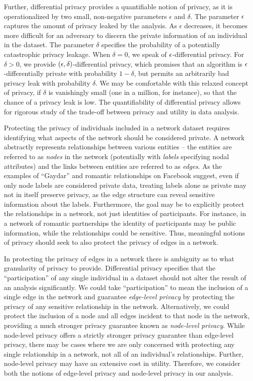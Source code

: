 Further, differential privacy provides a quantifiable notion of privacy, as it is operationalized by two small, non-negative parameters $\epsilon$ and $\delta$. The parameter $\epsilon$ captures the amount of privacy leaked by the analysis. As $\epsilon$ decreases, it becomes more difficult for an adversary to discern the private information of an individual in the dataset. The parameter $\delta$ specifies the probability of a potentially catastrophic privacy leakage. When $\delta = 0$, we speak of $\epsilon$-differential privacy. For $\delta > 0$, we provide $(\epsilon, \delta)$-differential privacy, which promises that an algorithm is $\epsilon$-differentially private with probability $1-\delta$, but permits an arbitrarily bad privacy leak with probability $\delta$. We may be comfortable with this relaxed concept of privacy, if $\delta$ is vanishingly small (one in a million, for instance), so that the chance of a privacy leak is low. The quantifiability of differential privacy allows for rigorous study of the trade-off between privacy and utility in data analysis.

Protecting the privacy of individuals included in a network dataset requires identifying what aspects of the network should be considered private. A network abstractly represents relationships between various entities -- the entities are referred to as \emph{nodes} in the network (potentially with \emph{labels} specifying nodal attributes) and the links between entities are referred to as \emph{edges}. As the examples of ``Gaydar'' and romantic relationships on Facebook suggest, even if only node labels are considered private data, treating labels alone as private may not in itself preserve privacy, as the edge structure can reveal sensitive information about the labels. Furthermore, the goal may be to explicitly protect the relationships in a network, not just identities of participants. For instance, in a network of romantic partnerships the identity of participants may be public information, while the relationships could be sensitive. Thus, meaningful notions of privacy should seek to also protect the privacy of edges in a network.

In protecting the privacy of edges in a network there is ambiguity as to what granularity of privacy to provide. Differential privacy specifies that the ``participation'' of any single individual in a dataset should not alter the result of an analysis significantly. We could take ``participation'' to mean the inclusion of a single edge in the network and guarantee \emph{edge-level privacy} by protecting the privacy of any sensitive relationship in the network. Alternatively, we could protect the inclusion of a node and all edges incident to that node in the network, providing a much stronger privacy guarantee known as \emph{node-level privacy}. While node-level privacy offers a strictly stronger privacy guarantee than edge-level privacy, there may be cases where we are only concerned with protecting any single relationship in a network, not all of an individual's relationships. Further, node-level privacy may have an extensive cost in utility. Therefore, we consider both the notions of edge-level privacy and node-level privacy in our analysis.

